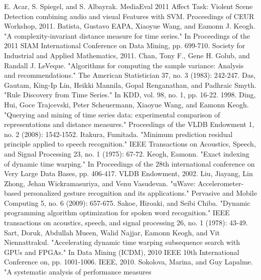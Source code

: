 \newpage
\begin{thebibliography}{1} 
    \normalsize
     E. Acar, S. Spiegel, and S. Albayrak. MediaEval 2011 Affect Task: Violent Scene Detection combining audio and visual Features with SVM. 
    	Proceedings of CEUR Workshop, 2011.
     Batista, Gustavo EAPA, Xiaoyue Wang, and Eamonn J. Keogh. "A complexity-invariant
        distance measure for time series." In Proceedings of the 2011 SIAM International Conference on Data Mining, pp.
        699-710. Society for Industrial and Applied Mathematics, 2011.
     Chan, Tony F., Gene H. Golub, and Randall J. LeVeque. "Algorithms for computing the
        sample variance: Analysis and recommendations." The American Statistician 37, no. 3 (1983): 242-247.
     Das, Gautam, King-Ip Lin, Heikki Mannila, Gopal Renganathan, and Padhraic Smyth. "Rule
        Discovery from Time Series." In KDD, vol. 98, no. 1, pp. 16-22. 1998.
     Ding, Hui, Goce Trajcevski, Peter Scheuermann, Xiaoyue Wang, and Eamonn Keogh. "Querying
        and mining of time series data: experimental comparison of representations and distance measures." Proceedings
        of the VLDB Endowment 1, no. 2 (2008): 1542-1552.
     Itakura, Fumitada. "Minimum prediction residual principle applied to speech
        recognition." IEEE Transactions on Acoustics, Speech, and Signal Processing 23, no. 1 (1975): 67-72.
     Keogh, Eamonn. "Exact indexing of dynamic time warping." In Proceedings of the 28th
        international conference on Very Large Data Bases, pp. 406-417. VLDB Endowment, 2002.
     Liu, Jiayang, Lin Zhong, Jehan Wickramasuriya, and Venu Vasudevan. "uWave:
        Accelerometer-based personalized gesture recognition and its applications." Pervasive and Mobile Computing 5,
        no. 6 (2009): 657-675.
     Sakoe, Hiroaki, and Seibi Chiba. "Dynamic programming algorithm optimization for spoken
        word recognition." IEEE transactions on acoustics, speech, and signal processing 26, no. 1 (1978): 43-49.
     Sart, Doruk, Abdullah Mueen, Walid Najjar, Eamonn Keogh, and Vit Niennattrakul.
        "Accelerating dynamic time warping subsequence search with GPUs and FPGAs." In Data Mining (ICDM), 2010 IEEE
        10th International Conference on, pp. 1001-1006. IEEE, 2010.
     Sokolova, Marina, and Guy Lapalme. "A systematic analysis of performance measures

\end{thebibliography}
